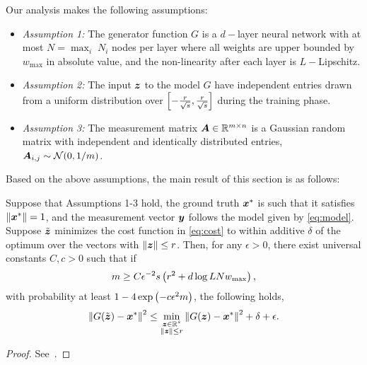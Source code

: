 \documentclass[journal]{IEEEtran}
\begin{document}
Our analysis makes the following assumptions:
\begin{itemize}[leftmargin=0cm]
    \item [] \emph{Assumption 1:} The generator function $G$ is a $d-$layer neural network with at most $N=\max_i\;N_i$ nodes per layer where all weights are upper bounded by  $ w_{\max}$ in absolute value, and the non-linearity after each layer is $L-$Lipschitz.
    \item [] \emph{Assumption 2:} The input $\boldsymbol{z}$ to the model $G$ have independent entries drawn from a  uniform distribution over $\left[-\frac{r}{\sqrt{s}},\frac{r}{\sqrt{s}}\right]$ during the training phase.
    \item [] \emph{Assumption 3:} The measurement matrix   $\boldsymbol{A}\in\mathbb{R}^{m\times n}$ is a Gaussian random matrix with independent and identically distributed entries, $\boldsymbol{A}_{i,j}\sim\mathcal{N}(0,1/m)$.
\end{itemize}
Based on the above assumptions, the main result of this section is as follows:
\begin{theorem}\label{thm:NN_error}
Suppose that Assumptions 1-3 hold, the ground truth $\boldsymbol{x}^*$ is such that it satisfies $\left\Vert\boldsymbol{x}^*\right\Vert = 1$, and the measurement vector $\boldsymbol{y}$ follows the model given by \eqref{eq:model}. Suppose $\tilde{\boldsymbol{z}}$ minimizes the cost function in \eqref{eq:cost} to within additive $\delta$ of the optimum over the vectors with $\left\Vert \boldsymbol{z}\right\Vert\leq r$. Then, for any $\epsilon>0$, there exist universal constants $C,c>0$ such that if \begin{equation}\label{eq:m_bound}
m\geq C\epsilon^{-2}s\left( r^2+d\log LNw_{\max} \right),
\end{equation} 
with probability at least $1-4\exp\left(-c\epsilon^2 m\right)$, the following holds,
\begin{equation}\label{eq:l_bound}
\left\Vert G(\tilde{\boldsymbol{z}})-\boldsymbol{x}^*\right\Vert^2\leq \underset{\substack{\boldsymbol{z}\in\mathbb{R}^s\\\left\Vert\boldsymbol{z}\right\Vert\leq r}}{\min}\left\Vert G(\boldsymbol{z})-\boldsymbol{x}^*\right\Vert^2+\delta+\epsilon.
\end{equation}
\end{theorem}
\begin{proof}
    See~.
\end{proof}
\end{document}
